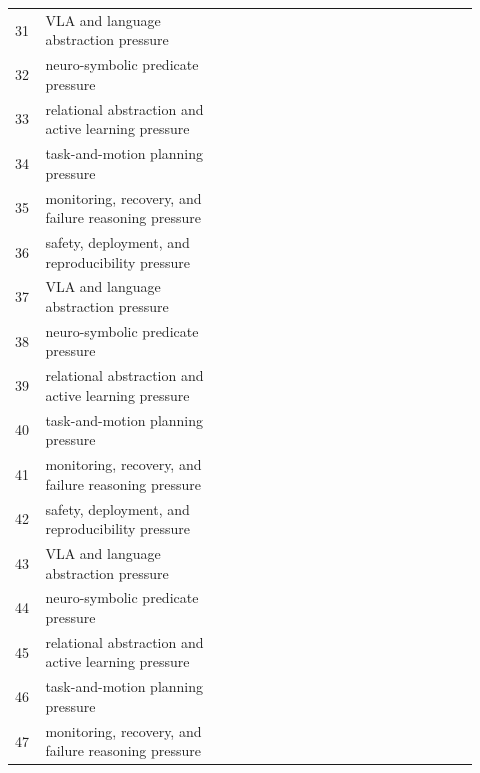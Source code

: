 \documentclass[11pt]{article}
\begin{document}
\begin{longtable}{p{0.06\linewidth}p{0.38\linewidth}p{0.48\linewidth}}
31 & VLA and language abstraction pressure & \citep{zhang2025mitigating91,galitsky2026neurosymbolic92,berg2022using93} \\
32 & neuro-symbolic predicate pressure & \citep{chalvatzaki2023learning94,maclean2021where95,zhou2024isrllm96} \\
33 & relational abstraction and active learning pressure & \citep{mitterer2024automating97,skerrett2014the98,han2025development99} \\
34 & task-and-motion planning pressure & \citep{winter2006trajectories100,zhang2024badrobot101,zenil2026on102} \\
35 & monitoring, recovery, and failure reasoning pressure & \citep{wangndbridging103,shirai2024visionlanguage104,wang2024large105} \\
36 & safety, deployment, and reproducibility pressure & \citep{liang2023code106,dobrovsky2025intelligent107,hsu2025from108} \\
37 & VLA and language abstraction pressure & \citep{dearden2014manipulation109,fu2022the110,yang2025guiding111} \\
38 & neuro-symbolic predicate pressure & \citep{xie2024embodiedrag112,park2023deep113,buehler2024xlora114} \\
39 & relational abstraction and active learning pressure & \citep{hamilton2024is115,wu2025a116,quan2020critical117} \\
40 & task-and-motion planning pressure & \citep{tsushima2025task118,dai2024optimal119,yang2025planllm120} \\
41 & monitoring, recovery, and failure reasoning pressure & \citep{chen2025affordancesoriented121,torralba2018symbolic122,ref2018the123} \\
42 & safety, deployment, and reproducibility pressure & \citep{sakib2025star124,pacaud2025scaling125,lynch1996stable126} \\
43 & VLA and language abstraction pressure & \citep{zhou2026opendrivevla127,wang2025conformal128,yi2024applications129} \\
44 & neuro-symbolic predicate pressure & \citep{wang2025probabilistically130,konidaris2018from131,yu2025mutpllm132} \\
45 & relational abstraction and active learning pressure & \citep{shi2025scvlm133,joseph2023large134,yuendplanagent135} \\
46 & task-and-motion planning pressure & \citep{sakib2025star136,yang2024adapt2reward137,fu2024degradation138} \\
47 & monitoring, recovery, and failure reasoning pressure & \citep{li2026tcot139,rubavicius2025learning140,matthewmanndlarge141} \\

\end{longtable}
\end{document}
